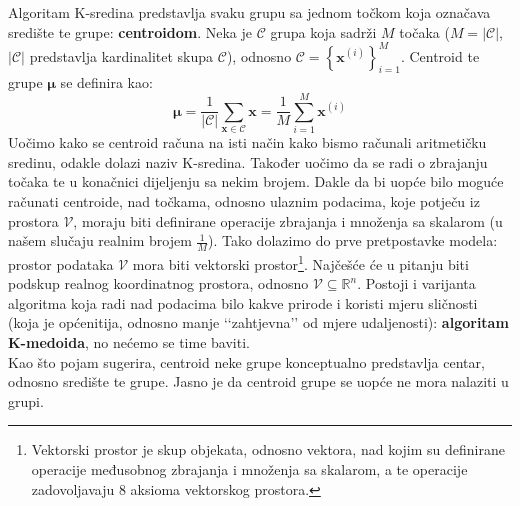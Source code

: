 \documentclass[times, utf8, zavrsni]{fer}
\begin{document}
Algoritam K-sredina predstavlja svaku grupu sa jednom točkom koja označava središte te grupe: \textbf{centroidom}. Neka je $\mathcal{C}$ grupa koja sadrži $M$ točaka ($M = \vert \mathcal{C} \vert$, $\vert \mathcal{C} \vert$ predstavlja kardinalitet skupa $\mathcal{C}$), odnosno 
$\mathcal{C} = \left\{ \mathbf{x}^{(i)}  \right\}_{i=1}^{M}$.
Centroid te grupe $\boldsymbol{\mu}$ se definira kao:
\[\boldsymbol{\mu} = \frac{1}{\vert \mathcal{C} \vert} \sum_{\mathbf{x} \in \mathcal{C}} \mathbf{x} = 
\frac{1}{M} \sum_{i=1}^{M} \mathbf{x}^{(i)}\]
Uočimo kako se centroid računa na isti način kako bismo računali aritmetičku sredinu, odakle dolazi naziv K-sredina. Također uočimo da se radi o zbrajanju točaka te u konačnici dijeljenju sa nekim brojem. Dakle da bi uopće bilo moguće računati centroide, nad točkama, odnosno ulaznim podacima, koje potječu iz prostora $\mathcal{V}$, moraju biti definirane operacije zbrajanja i množenja sa skalarom (u našem slučaju realnim brojem $\frac{1}{M}$). Tako dolazimo do prve pretpostavke modela: prostor podataka $\mathcal{V}$ mora biti vektorski prostor\footnote{Vektorski prostor je skup objekata, odnosno vektora, nad kojim su definirane operacije međusobnog zbrajanja i množenja sa skalarom, a te operacije zadovoljavaju 8 aksioma vektorskog prostora.}. Najčešće će u pitanju biti podskup realnog koordinatnog prostora, odnosno $\mathcal{V} \subseteq \mathbb{R}^n$. 
Postoji i varijanta algoritma koja radi nad podacima bilo kakve prirode i koristi mjeru sličnosti (koja je općenitija, odnosno manje ‘‘zahtjevna’’ od mjere udaljenosti): \textbf{algoritam K-medoida}, no nećemo se time baviti.\\
Kao što pojam sugerira, centroid neke grupe konceptualno predstavlja centar, odnosno središte te grupe. Jasno je da centroid grupe se uopće ne mora nalaziti u grupi.
\end{document}
